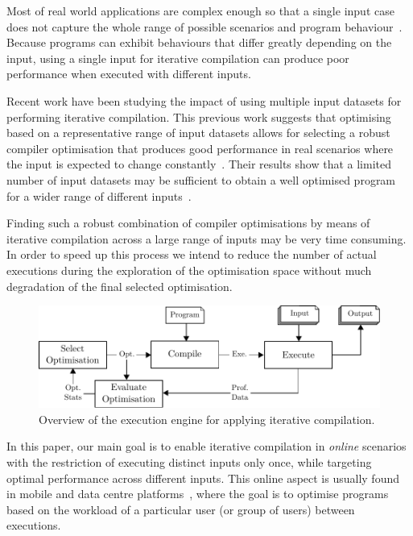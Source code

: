 \documentclass[sigplan,9pt]{acmart}
\newcommand{\itercomp}{{iterative compilation}}
\begin{document}
Most of real world applications are complex enough so that a single input case does not capture the whole range of possible scenarios and program behaviour~\cite{haneda06,fursin07,chen10,chen12a}.
Because programs can exhibit behaviours that differ greatly depending on the input,
using a single input for {\itercomp} can produce poor performance when executed with different inputs.

Recent work have been studying the impact of using multiple input datasets
for performing {\itercomp}.
This previous work suggests that optimising based on a representative range of input datasets allows for selecting a robust compiler optimisation that produces good performance in real scenarios where the input is expected to change constantly~\cite{haneda06,fursin07,chen10,chen12a,chen12b,fang15,mpeis16}.
Their results show that a limited number of input datasets may be sufficient to obtain a well optimised program for a wider range of different inputs~\cite{haneda06,fursin07,chen10,chen12a}.

Finding such a robust combination of compiler optimisations by means of {\itercomp} across a large range of inputs may be very time consuming.
In order to speed up this process we intend to reduce the number of actual executions during the exploration of the optimisation space without much degradation of the final selected optimisation.

\begin{figure}[htb]
    \centering
    \includegraphics[width=\linewidth]{figs/diagram}
    \caption{Overview of the execution engine for applying {\itercomp}.}
    \label{fig:diagram}
\end{figure}

In this paper, our main goal is to enable {\itercomp} in \textit{online} scenarios with the restriction of executing distinct inputs only once, while targeting optimal performance across different inputs.
This online aspect is usually found in mobile and data centre platforms~\cite{chen12b,fang15,mpeis16}, where the goal is to optimise programs based on the workload of a particular user (or group of users) between executions.
\end{document}
